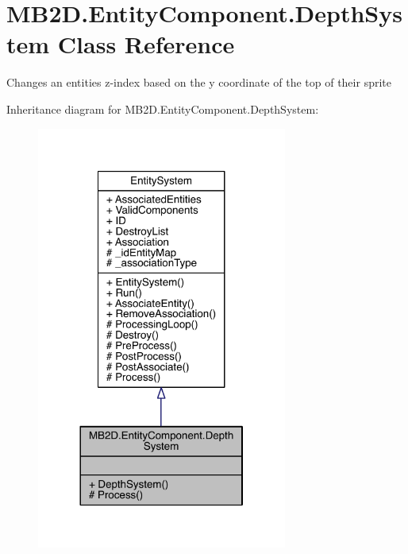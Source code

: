 \hypertarget{class_m_b2_d_1_1_entity_component_1_1_depth_system}{}\section{M\+B2\+D.\+Entity\+Component.\+Depth\+System Class Reference}
\label{class_m_b2_d_1_1_entity_component_1_1_depth_system}


Changes an entities z-\/index based on the y coordinate of the top of their sprite  




Inheritance diagram for M\+B2\+D.\+Entity\+Component.\+Depth\+System\+:
\nopagebreak
\begin{figure}[H]
\begin{center}
\leavevmode
\includegraphics[width=233pt]{class_m_b2_d_1_1_entity_component_1_1_depth_system__inherit__graph}
\end{center}
\end{figure}



